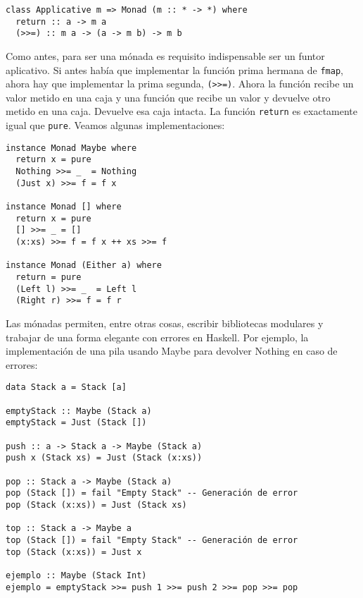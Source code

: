 \documentclass[class=article, crop=false]{standalone}
\begin{document}
\begin{verbatim}
class Applicative m => Monad (m :: * -> *) where
  return :: a -> m a
  (>>=) :: m a -> (a -> m b) -> m b
\end{verbatim}

Como antes, para ser una mónada es requisito indispensable ser un funtor aplicativo. Si antes
había que implementar la función prima hermana de \verb`fmap`, ahora hay que implementar la
prima segunda, \verb`(>>=)`. Ahora la función recibe un valor metido en una caja y una
función que recibe un valor y devuelve otro metido en una caja. Devuelve esa caja intacta. La
función \verb`return` es exactamente igual que \verb`pure`. Veamos algunas implementaciones:

\begin{verbatim}
instance Monad Maybe where
  return x = pure
  Nothing >>= _  = Nothing
  (Just x) >>= f = f x

instance Monad [] where
  return x = pure
  [] >>= _ = []
  (x:xs) >>= f = f x ++ xs >>= f

instance Monad (Either a) where
  return = pure
  (Left l) >>= _  = Left l
  (Right r) >>= f = f r
\end{verbatim}

Las mónadas permiten, entre otras cosas, escribir bibliotecas modulares y trabajar de una
forma elegante con errores en Haskell. Por ejemplo, la implementación de una pila usando
Maybe para devolver Nothing en caso de errores:

\begin{verbatim}
data Stack a = Stack [a]

emptyStack :: Maybe (Stack a)
emptyStack = Just (Stack [])

push :: a -> Stack a -> Maybe (Stack a)
push x (Stack xs) = Just (Stack (x:xs))

pop :: Stack a -> Maybe (Stack a)
pop (Stack []) = fail "Empty Stack" -- Generación de error
pop (Stack (x:xs)) = Just (Stack xs)

top :: Stack a -> Maybe a
top (Stack []) = fail "Empty Stack" -- Generación de error
top (Stack (x:xs)) = Just x

ejemplo :: Maybe (Stack Int)
ejemplo = emptyStack >>= push 1 >>= push 2 >>= pop >>= pop
\end{verbatim}
\end{document}
